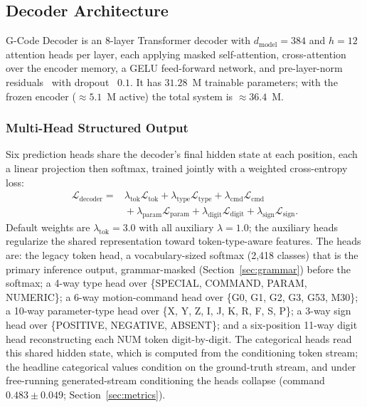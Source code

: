 \documentclass[conference]{IEEEtran}
\newcommand{\modelname}{G-Code Decoder}
\begin{document}
\subsection{Decoder Architecture}
\label{sec:decoder}

\modelname{} is an 8-layer Transformer decoder with $d_{\text{model}}=384$ and $h=12$ attention heads per layer, each applying masked self-attention, cross-attention over the encoder memory, a GELU feed-forward network, and pre-layer-norm residuals~\cite{ba2016layernorm} with dropout~\cite{srivastava2014dropout} $0.1$. It has $31.28$~M trainable parameters; with the frozen encoder ($\approx\!5.1$~M active) the total system is $\approx\!36.4$~M.

\subsubsection{Multi-Head Structured Output}
\label{sec:multihead}

Six prediction heads share the decoder's final hidden state at each position, each a linear projection then softmax, trained jointly with a weighted cross-entropy loss:
\begin{equation*}
\begin{aligned}
\mathcal{L}_{\text{decoder}} ={}& \lambda_{\text{tok}}\mathcal{L}_{\text{tok}} + \lambda_{\text{type}}\mathcal{L}_{\text{type}} + \lambda_{\text{cmd}}\mathcal{L}_{\text{cmd}} \\
& {}+ \lambda_{\text{param}}\mathcal{L}_{\text{param}} + \lambda_{\text{digit}}\mathcal{L}_{\text{digit}} + \lambda_{\text{sign}}\mathcal{L}_{\text{sign}}.
\end{aligned}
\end{equation*}
Default weights are $\lambda_{\text{tok}}=3.0$ with all auxiliary $\lambda=1.0$; the auxiliary heads regularize the shared representation toward token-type-aware features. The heads are: the legacy token head, a vocabulary-sized softmax (2{,}418 classes) that is the primary inference output, grammar-masked (Section~\ref{sec:grammar}) before the softmax; a 4-way type head over \{SPECIAL, COMMAND, PARAM, NUMERIC\}; a 6-way motion-command head over \{G0, G1, G2, G3, G53, M30\}; a 10-way parameter-type head over \{X, Y, Z, I, J, K, R, F, S, P\}; a 3-way sign head over \{POSITIVE, NEGATIVE, ABSENT\}; and a six-position 11-way digit head reconstructing each NUM token digit-by-digit. The categorical heads read this shared hidden state, which is computed from the conditioning token stream; the headline categorical values condition on the ground-truth stream, and under free-running generated-stream conditioning the heads collapse (command $0.483 \pm 0.049$; Section~\ref{sec:metrics}).
\end{document}
